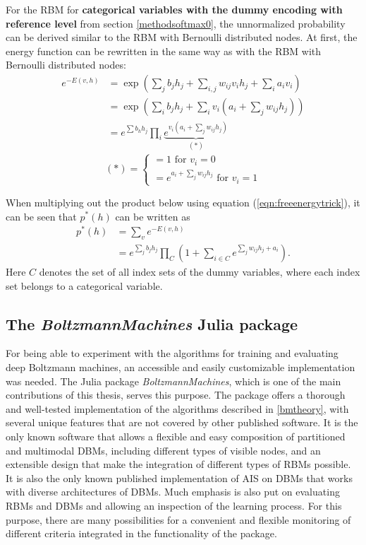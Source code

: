 \documentclass[12pt]{article}
\newcommand{\apkg}[1]{\emph{#1}}
\begin{document}
For the RBM for {\bf categorical variables with the dummy encoding with reference level} from section \ref{methodsoftmax0}, the unnormalized probability can be derived similar to the RBM with Bernoulli distributed nodes. At first, the energy function can be rewritten in the same way as with the RBM with Bernoulli distributed nodes:
\begin{align}
e^{-E(v,h)} &= \exp \left(\sum_j b_j h_j + \sum_{i,j} w_{ij} v_i h_j + \sum_i a_i v_i \right) \nonumber \\
&= \exp \left( \sum_i b_j h_j + \sum_i v_i \left( a_i + \sum_j w_{ij} h_j \right) \right) \nonumber \\
&= e^{\sum b_h h_j} \prod_i \underbrace{e^{v_i (a_i + \sum_j w_{ij} h_j)}}_{(*)}
\label{eqn:freeenergytrick}
\end{align}
\begin{equation*}
(*) = \left\{
\begin{array}{l}
 =1 \text{ for } v_i = 0 \\
 = e^{a_i +\sum_j w_{ij} h_j} \text{ for } v_i = 1 
\end{array} \right.
\end{equation*}

When multiplying out the product below using equation (\ref{eqn:freeenergytrick}), it can be seen that $p^*(h)$ can be written as
\begin{align*}
p^*(h) &= \sum_v e^{-E(v,h)} \\
&= e^{\sum_j b_j h_j} \prod_{C} \left( 1 + \sum_{i \in C} e^{\sum_j w_{ij} h_j + a_i} \right).
\end{align*}
Here $C$ denotes the set of all index sets of the dummy variables, where each index set belongs to a categorical variable.

\subsection{The \apkg{BoltzmannMachines} Julia package}
For being able to experiment with the algorithms for training and evaluating deep Boltzmann machines, an accessible and easily customizable implementation was needed.
The Julia package \apkg{BoltzmannMachines}, which is one of the main contributions of this thesis, serves this purpose.
The package offers a thorough and well-tested implementation of the algorithms described in \ref{bmtheory}, with several unique features that are not covered by other published software.
It is the only known software that allows a flexible and easy composition of partitioned and multimodal DBMs, including different types of visible nodes, and an extensible design that make the integration of different types of RBMs possible.
It is also the only known published implementation of AIS on DBMs that works with diverse architectures of DBMs.
Much emphasis is also put on evaluating RBMs and DBMs and allowing an inspection of the learning process.
For this purpose, there are many possibilities for a convenient and flexible monitoring of different criteria integrated in the functionality of the package.
\end{document}
